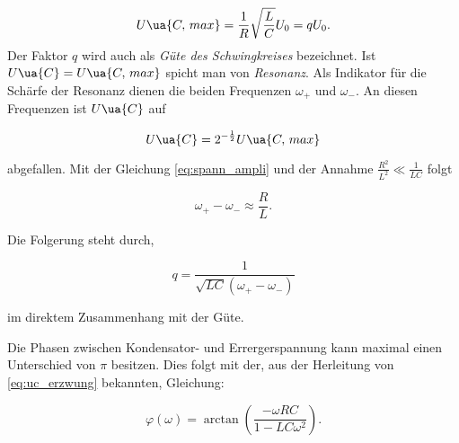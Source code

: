 \begin{equation}
  \label{eq:spann_ampli}
  U\ua{C,\, max}=\frac{1}{R}\sqrt{\frac{L}{C}}U_0=qU_0.
\end{equation}
Der Faktor $q$ wird auch als \emph{Güte des Schwingkreises} bezeichnet.
Ist $U\ua{C}=U\ua{C,\, max}$ spicht man von \emph{Resonanz}.
Als Indikator für die Schärfe der Resonanz dienen die beiden
Frequenzen $\omega_+$ und $\omega_-$. An diesen Frequenzen ist
$U\ua{C}$ auf

\begin{equation*}
   U\ua{C}=2^{-\frac{1}{2}} U\ua{C,\, max}
\end{equation*}

abgefallen.
Mit der Gleichung \eqref{eq:spann_ampli} und der Annahme $\frac{R^2}{L^2}\ll \frac{1}{LC}$
folgt

\begin{equation}
  \label{eq:omega_+_-}
  \omega_+-\omega_-\approx \frac{R}{L}.
\end{equation}

Die Folgerung steht durch, %

\begin{equation*}
  q=\frac{1}{\sqrt{LC}\left(\omega_+-\omega_-\right)}
  \label{eq: resonanzüberhöhung}
\end{equation*}

im direktem Zusammenhang mit der Güte.

Die Phasen zwischen Kondensator- und Errergerspannung kann maximal
einen Unterschied von $\pi$ besitzen. Dies folgt mit der, aus der
Herleitung von \eqref{eq:uc_erzwung} bekannten, Gleichung:

\begin{equation}
  \label{eq:phase}
  \varphi(\omega)=\arctan\left(\frac{-\omega RC}{1-LC\omega^2}\right).
\end{equation}
